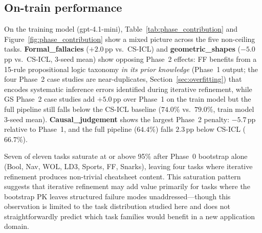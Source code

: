 \documentclass{article}
\begin{document}
\subsection{On-train performance}
\label{sec:overall}

On the training model (gpt-4.1-mini), Table~\ref{tab:phase_contribution} and
Figure~\ref{fig:phase_contribution} show a mixed picture across the five non-ceiling tasks.
\textbf{Formal\_fallacies} ($+2.0$\,pp vs.\ CS-ICL) and \textbf{geometric\_shapes}
($-5.0$\,pp vs.\ CS-ICL, 3-seed mean) show opposing Phase~2 effects: FF benefits from a
15-rule propositional logic taxonomy \emph{in its prior knowledge} (Phase~1 output; the four
Phase~2 case studies are near-duplicates, Section~\ref{sec:overfitting}) that encodes systematic
inference errors identified during iterative refinement, while GS Phase~2 case studies add $+5.0$\,pp over Phase~1
on the train model but the full pipeline still falls below the CS-ICL baseline
($74.0\%$ vs.\ $79.0\%$, train model 3-seed mean).
\textbf{Causal\_judgement} shows the largest Phase~2 penalty: $-5.7$\,pp relative to Phase~1,
and the full pipeline ($64.4\%$) falls $2.3$\,pp below CS-ICL ($66.7\%$).

Seven of eleven tasks saturate at or above 95\% after Phase~0 bootstrap alone (Bool, Nav, WOL,
LD3, Sports, FF, Snarks), leaving four tasks where iterative refinement produces non-trivial
cheatsheet content.
This saturation pattern suggests that iterative refinement may add value primarily for tasks
where the bootstrap PK leaves structured failure modes unaddressed---though this observation
is limited to the task distribution studied here and does not straightforwardly predict which
task families would benefit in a new application domain.
\end{document}
